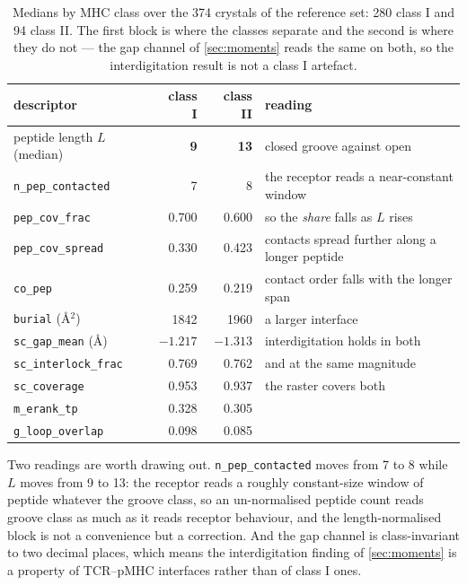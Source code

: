 \documentclass[11pt,a4paper]{article}
\newcommand{\dsc}[1]{\texttt{#1}}
\begin{document}
\begin{table}[t]
\centering\small
\begin{tabular}{@{}lrrl@{}}
\toprule
descriptor & class I & class II & reading \\
\midrule
peptide length $L$ (median)   & \textbf{9} & \textbf{13} & closed groove against open \\
\dsc{n\_pep\_contacted}       & 7 & 8 & the receptor reads a near-constant window \\
\dsc{pep\_cov\_frac}          & 0.700 & 0.600 & so the \emph{share} falls as $L$ rises \\
\dsc{pep\_cov\_spread}        & 0.330 & 0.423 & contacts spread further along a longer peptide \\
\dsc{co\_pep}                 & 0.259 & 0.219 & contact order falls with the longer span \\
\dsc{burial} (\AA$^2$)        & 1842 & 1960 & a larger interface \\
\addlinespace
\dsc{sc\_gap\_mean} (\AA)     & $-1.217$ & $-1.313$ & interdigitation holds in both \\
\dsc{sc\_interlock\_frac}     & 0.769 & 0.762 & and at the same magnitude \\
\dsc{sc\_coverage}            & 0.953 & 0.937 & the raster covers both \\
\dsc{m\_erank\_tp}            & 0.328 & 0.305 & \\
\dsc{g\_loop\_overlap}        & 0.098 & 0.085 & \\
\bottomrule
\end{tabular}
\caption{Medians by MHC class over the 374 crystals of the reference set: 280 class I and 94 class
II. The first block is where the classes separate and the second is where they do not --- the gap
channel of \cref{sec:moments} reads the same on both, so the interdigitation result is not a class I
artefact.}
\label{tab:classes}
\end{table}

Two readings are worth drawing out. \dsc{n\_pep\_contacted} moves from 7 to 8 while $L$ moves from 9
to 13: the receptor reads a roughly constant-size window of peptide whatever the groove class, so an
un-normalised peptide count reads groove class as much as it reads receptor behaviour, and the
length-normalised block is not a convenience but a correction. And the gap channel is
class-invariant to two decimal places, which means the interdigitation finding of
\cref{sec:moments} is a property of TCR--pMHC interfaces rather than of class I ones.
\end{document}
